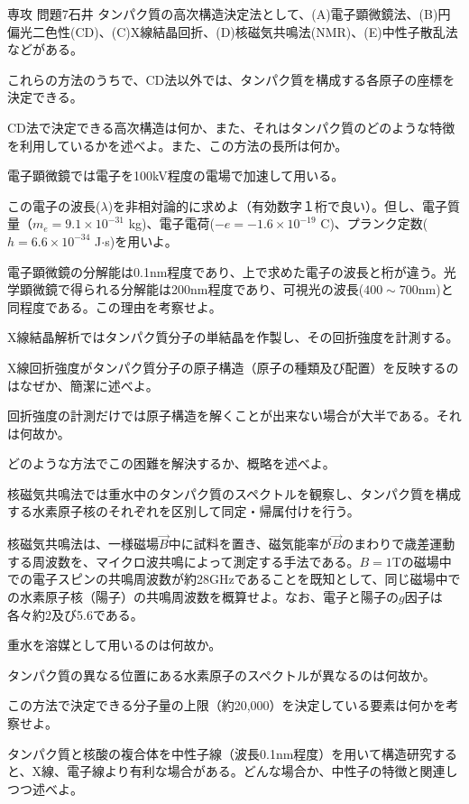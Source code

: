 \documentclass[fleqn]{jbook}
\begin{document}
\begin{question}{専攻 問題7}{石井}
タンパク質の高次構造決定法として、(A)電子顕微鏡法、(B)円偏光二色性(CD)、(C)X線結晶回折、(D)核磁気共鳴法(NMR)、(E)中性子散乱法などがある。

これらの方法のうちで、CD法以外では、タンパク質を構成する各原子の座標を決定できる。

\begin{subquestions}
\SubQuestion
CD法で決定できる高次構造は何か、また、それはタンパク質のどのような特徴を利用しているかを述べよ。また、この方法の長所は何か。

\SubQuestion
電子顕微鏡では電子を100kV程度の電場で加速して用いる。

\begin{subsubquestions}
\SubSubQuestion
この電子の波長($\lambda$)を非相対論的に求めよ（有効数字１桁で良い）。但し、電子質量（$m_e=9.1\times 10^{-31}$ kg)、電子電荷($-e=-1.6 \times 10^{-19}$ C)、プランク定数($h=6.6\times 10^{-34}$ J$\cdot$s)を用いよ。

\SubSubQuestion
電子顕微鏡の分解能は0.1nm程度であり、上で求めた電子の波長と桁が違う。光学顕微鏡で得られる分解能は200nm程度であり、可視光の波長($400\sim 700$nm)と同程度である。この理由を考察せよ。
\end{subsubquestions}

\SubQuestion
X線結晶解析ではタンパク質分子の単結晶を作製し、その回折強度を計測する。

\begin{subsubquestions}
\SubSubQuestion
X線回折強度がタンパク質分子の原子構造（原子の種類及び配置）を反映するのはなぜか、簡潔に述べよ。

\SubSubQuestion
回折強度の計測だけでは原子構造を解くことが出来ない場合が大半である。それは何故か。

\SubSubQuestion
どのような方法でこの困難を解決するか、概略を述べよ。
\end{subsubquestions}

\SubQuestion
核磁気共鳴法では重水中のタンパク質のスペクトルを観察し、タンパク質を構成する水素原子核のそれぞれを区別して同定・帰属付けを行う。

\begin{subsubquestions}
\SubSubQuestion
核磁気共鳴法は、一様磁場$\vec{B}$中に試料を置き、磁気能率が$\vec{B}$のまわりで歳差運動する周波数を、マイクロ波共鳴によって測定する手法である。$B=1$Tの磁場中での電子スピンの共鳴周波数が約28GHzであることを既知として、同じ磁場中での水素原子核（陽子）の共鳴周波数を概算せよ。なお、電子と陽子の$g$因子は各々約2及び5.6である。

\SubSubQuestion
重水を溶媒として用いるのは何故か。

\SubSubQuestion
タンパク質の異なる位置にある水素原子のスペクトルが異なるのは何故か。

\SubSubQuestion
この方法で決定できる分子量の上限（約20,000）を決定している要素は何かを考察せよ。
\end{subsubquestions}

\SubQuestion
タンパク質と核酸の複合体を中性子線（波長0.1nm程度）を用いて構造研究すると、X線、電子線より有利な場合がある。どんな場合か、中性子の特徴と関連しつつ述べよ。

\end{subquestions}
\end{question}
\end{document}
